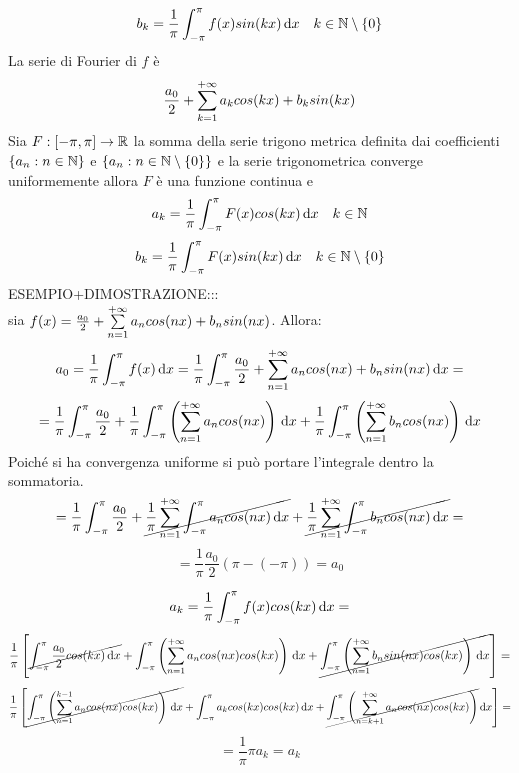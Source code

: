\[b_k=\frac{1}{\pi}\int_{-\pi}^{\pi}f(x)sin(kx)\,\mathrm{d}{x}\quad k\in\mathbb{N}\setminus{\left\{0\right\}}\]
La serie di Fourier di $f$ è
\[\frac{a_0}{2}+\sum\limits_{k=1}^{+\infty}a_{k}cos(kx)+b_{k}sin(kx)\]
\proposition
Sia $F: \left[-\pi,\pi\right] \to \mathbb{R}$ la somma della serie trigono metrica definita dai coefficienti $\left\{a_n:n\in\mathbb{N}\right\}$ e $\left\{a_n:n\in\mathbb{N}\setminus\left\{0\right\}\right\}$ e la serie trigonometrica converge uniformemente allora $F$ è una funzione continua e
\[a_k=\frac{1}{\pi}\int_{-\pi}^{\pi}F(x)cos(kx)\,\mathrm{d}{x}\quad k\in\mathbb{N}\]
\[b_k=\frac{1}{\pi}\int_{-\pi}^{\pi}F(x)sin(kx)\,\mathrm{d}{x}\quad k\in\mathbb{N}\setminus{\left\{0\right\}}\]
ESEMPIO+DIMOSTRAZIONE:::\\
sia $f(x)=\frac{a_0}{2}+\sum\limits_{n=1}^{+\infty}a_{n}cos(nx)+b_{n}sin(nx)$. Allora:\\
\[a_0=\frac{1}{\pi}\int_{-\pi}^{\pi}f(x)\,\mathrm{d}{x}=\frac{1}{\pi}\int_{-\pi}^{\pi}\frac{a_0}{2}+\sum\limits_{n=1}^{+\infty}a_{n}cos(nx)+b_{n}sin(nx)\,\mathrm{d}{x}=\]
\[
= \frac{1}{\pi}\int_{-\pi}^{\pi}\frac{a_0}{2} +
\frac{1}{\pi}\int_{-\pi}^{\pi}\left(\sum\limits_{n=1}^{+\infty} a_n cos(nx)\right)\,\mathrm{d}{x} +
\frac{1}{\pi}\int_{-\pi}^{\pi}\left(\sum\limits_{n=1}^{+\infty} b_n cos(nx)\right)\,\mathrm{d}{x}
\]
Poiché si ha convergenza uniforme si può portare l'integrale dentro la sommatoria.
\[
= \frac{1}{\pi}\int_{-\pi}^{\pi}\frac{a_0}{2} +
\cancel{\frac{1}{\pi}\sum\limits_{n=1}^{+\infty}\int_{-\pi}^{\pi} a_n cos(nx)\,\mathrm{d}{x}} +
\cancel{\frac{1}{\pi}\sum\limits_{n=1}^{+\infty}\int_{-\pi}^{\pi} b_n cos(nx)\,\mathrm{d}{x}}=
\]
\[=\frac{1}{\pi}\frac{a_0}{2}\left(\pi-(-\pi)\right)=a_0\]


\[a_k=\frac{1}{\pi}\int_{-\pi}^{\pi}f(x)cos(kx)\,\mathrm{d}{x}=\]
\[\frac{1}{\pi}\left[
\cancel{\int_{-\pi}^{\pi}\frac{a_0}{2}cos(kx)\,\mathrm{d}{x}}+
\int_{-\pi}^{\pi}\left(\sum\limits_{n=1}^{+\infty}a_ncos(nx)cos(kx)\right)\,\mathrm{d}{x}+
\cancel{\int_{-\pi}^{\pi}\left(\sum\limits_{n=1}^{+\infty}b_nsin(nx)cos(kx)\right)\,\mathrm{d}{x}}
\right]=\]
\[\frac{1}{\pi}\left[
\cancel{\int_{-\pi}^{\pi}\left(\sum\limits_{n=1}^{k-1} a_ncos(nx)cos(kx)\right)\,\mathrm{d}{x}}+
\int_{-\pi}^{\pi}a_kcos(kx)cos(kx)\,\mathrm{d}{x}+
\cancel{\int_{-\pi}^{\pi}\left(\sum\limits_{n=k+1}^{+\infty}a_ncos(nx)cos(kx)\right)}\,\mathrm{d}{x}
\right]=\]
\[=\frac{1}{\pi}\pi a_k=a_k\]

